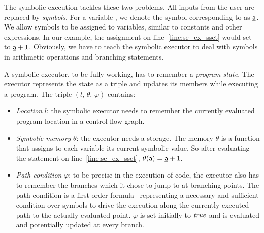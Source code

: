 The symbolic execution tackles these two problems. All inputs from the user
are replaced by \emph{symbols}. For a variable , we denote the symbol
corresponding to  as $\underline{\mathsf{a}}$. We allow symbols to be assigned to
variables, similar to constants and other expressions. In our example, the
assignment on line~\ref{line:se_ex_sset} would set  to $\underline{\mathsf{a}}+1$.
Obviously, we have to teach the symbolic executor to deal with symbols in
arithmetic operations and branching statements.

A symbolic executor, to be fully working, has to remember a \emph{program
state}. The executor represents the state as a triple and updates its members
while executing a program. The triple $(l,\, \theta,\, \varphi)$ contains:
\begin{itemize}
\item \emph{Location} $l$: the symbolic executor needs to remember the
currently evaluated program location in a control flow graph.

\item \emph{Symbolic memory} $\theta$: the executor needs a storage. The
memory $\theta$ is a function that assigns to each variable its current
symbolic value. So after evaluating the statement on
line~\ref{line:se_ex_sset}, $\theta(\mathsf{a}) = \underline{\mathsf{a}}+1$.

\item \emph{Path condition} $\varphi$: to be precise in the execution of code,
the executor also has to remember the branches which it chose to jump to at
branching points. The path condition is a first-order formula~\cite{fol}
representing a necessary and sufficient condition over symbols to drive the
execution along the currently executed path to the actually evaluated point.
$\varphi$ is set initially to $\mathit{true}$ and is evaluated and potentially updated
at every branch.

\end{itemize}

